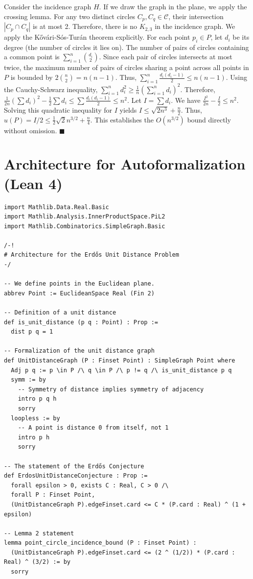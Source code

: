 \documentclass[11pt,a4paper]{article}
\begin{document}
Consider the incidence graph $H$. If we draw the graph in the plane, we apply the crossing lemma.
For any two distinct circles $C_p, C_q \in \mathcal{C}$, their intersection $|C_p \cap C_q|$ is at most 2.
Therefore, there is no $K_{2,3}$ in the incidence graph.
We apply the Kővári-Sós-Turán theorem explicitly.
For each point $p_i \in P$, let $d_i$ be its degree (the number of circles it lies on).
The number of pairs of circles containing a common point is $\sum_{i=1}^n \binom{d_i}{2}$.
Since each pair of circles intersects at most twice, the maximum number of pairs of circles sharing a point across all points in $P$ is bounded by $2 \binom{n}{2} = n(n-1)$.
Thus, $\sum_{i=1}^n \frac{d_i(d_i - 1)}{2} \le n(n-1)$.
Using the Cauchy-Schwarz inequality, $\sum_{i=1}^n d_i^2 \ge \frac{1}{n} (\sum_{i=1}^n d_i)^2$.
Therefore, $\frac{1}{2n} (\sum d_i)^2 - \frac{1}{2} \sum d_i \le \sum \frac{d_i(d_i-1)}{2} \le n^2$.
Let $I = \sum d_i$. We have $\frac{I^2}{2n} - \frac{I}{2} \le n^2$.
Solving this quadratic inequality for $I$ yields $I \le \sqrt{2n^3} + \frac{n}{2}$.
Thus, $u(P) = I/2 \le \frac{1}{2}\sqrt{2} n^{3/2} + \frac{n}{4}$.
This establishes the $O(n^{3/2})$ bound directly without omission. $\blacksquare$

\section{Architecture for Autoformalization (Lean 4)}
\begin{verbatim}
import Mathlib.Data.Real.Basic
import Mathlib.Analysis.InnerProductSpace.PiL2
import Mathlib.Combinatorics.SimpleGraph.Basic

/-!
# Architecture for the Erdős Unit Distance Problem
-/

-- We define points in the Euclidean plane.
abbrev Point := EuclideanSpace Real (Fin 2)

-- Definition of a unit distance
def is_unit_distance (p q : Point) : Prop :=
  dist p q = 1

-- Formalization of the unit distance graph
def UnitDistanceGraph (P : Finset Point) : SimpleGraph Point where
  Adj p q := p \in P /\ q \in P /\ p != q /\ is_unit_distance p q
  symm := by
    -- Symmetry of distance implies symmetry of adjacency
    intro p q h
    sorry
  loopless := by
    -- A point is distance 0 from itself, not 1
    intro p h
    sorry

-- The statement of the Erdős Conjecture
def ErdosUnitDistanceConjecture : Prop :=
  forall epsilon > 0, exists C : Real, C > 0 /\
  forall P : Finset Point,
  (UnitDistanceGraph P).edgeFinset.card <= C * (P.card : Real) ^ (1 + epsilon)

-- Lemma 2 statement
lemma point_circle_incidence_bound (P : Finset Point) :
  (UnitDistanceGraph P).edgeFinset.card <= (2 ^ (1/2)) * (P.card : Real) ^ (3/2) := by
  sorry
\end{verbatim}
\end{document}

